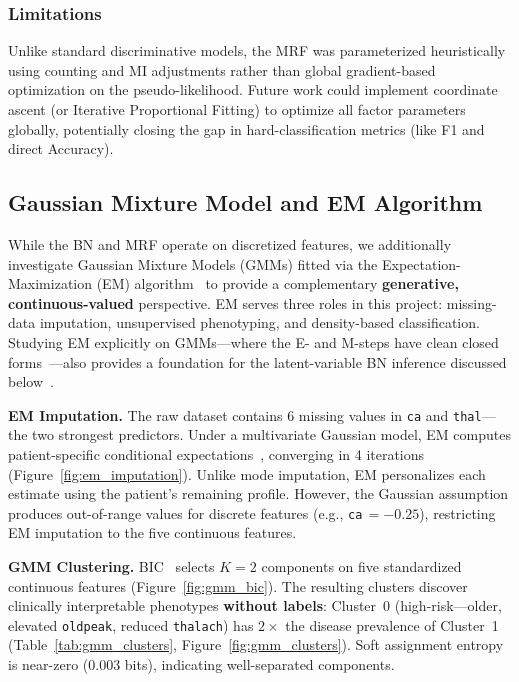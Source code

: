 \documentclass{article}
\begin{document}
\subsubsection{Limitations}
Unlike standard discriminative models, the MRF was parameterized heuristically using counting and MI adjustments rather than global gradient-based optimization on the pseudo-likelihood. Future work could implement coordinate ascent (or Iterative Proportional Fitting) to optimize all factor parameters globally, potentially closing the gap in hard-classification metrics (like F1 and direct Accuracy).

\subsection{Gaussian Mixture Model and EM Algorithm}

While the BN and MRF operate on discretized features, we additionally investigate Gaussian Mixture Models (GMMs) fitted via the Expectation-Maximization (EM) algorithm~\cite{dempster1977em} to provide a complementary \textbf{generative, continuous-valued} perspective. EM serves three roles in this project: missing-data imputation, unsupervised phenotyping, and density-based classification. Studying EM explicitly on GMMs---where the E- and M-steps have clean closed forms~\cite{bishop2006prml}---also provides a foundation for the latent-variable BN inference discussed below~\cite{koller2009pgm}.

\textbf{EM Imputation.} The raw dataset contains 6 missing values in \texttt{ca} and \texttt{thal}---the two strongest predictors. Under a multivariate Gaussian model, EM computes patient-specific conditional expectations~\cite{little1987rubin}, converging in 4 iterations (Figure~\ref{fig:em_imputation}). Unlike mode imputation, EM personalizes each estimate using the patient's remaining profile. However, the Gaussian assumption produces out-of-range values for discrete features (e.g., \texttt{ca}\,$= -0.25$), restricting EM imputation to the five continuous features.

\textbf{GMM Clustering.} BIC~\cite{schwarz1978bic} selects $K\!=\!2$ components on five standardized continuous features (Figure~\ref{fig:gmm_bic}). The resulting clusters discover clinically interpretable phenotypes \textbf{without labels}: Cluster~0 (high-risk---older, elevated \texttt{oldpeak}, reduced \texttt{thalach}) has $2\times$ the disease prevalence of Cluster~1 (Table~\ref{tab:gmm_clusters}, Figure~\ref{fig:gmm_clusters}). Soft assignment entropy is near-zero ($0.003$ bits), indicating well-separated components.
\end{document}
